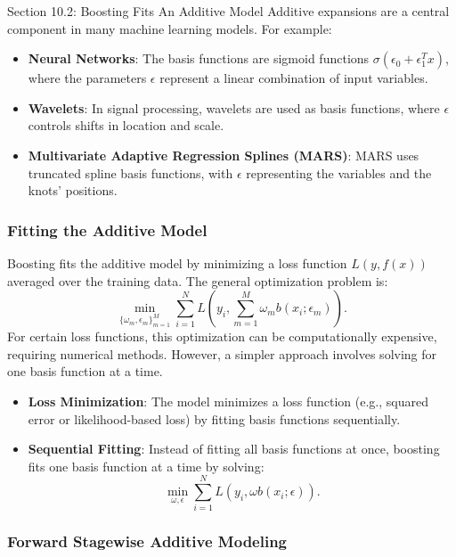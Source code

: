 \begin{notes}{Section 10.2: Boosting Fits An Additive Model}
    Additive expansions are a central component in many machine learning models. For example:
    \begin{itemize}
        \item \textbf{Neural Networks}: The basis functions are sigmoid functions $\sigma(\epsilon_0 + \epsilon_1^T x)$, where the parameters $\epsilon$ represent a linear combination of input variables.
        \item \textbf{Wavelets}: In signal processing, wavelets are used as basis functions, where $\epsilon$ controls shifts in location and scale.
        \item \textbf{Multivariate Adaptive Regression Splines (MARS)}: MARS uses truncated spline basis functions, with $\epsilon$ representing the variables and the knots' positions.
    \end{itemize}
    
    \subsubsection*{Fitting the Additive Model}
    
    Boosting fits the additive model by minimizing a loss function $L(y, f(x))$ averaged over the training data. The general optimization problem is:
    \[
    \min_{\{ \omega_m, \epsilon_m \}_{m=1}^M} \sum_{i=1}^{N} L\left( y_i, \sum_{m=1}^{M} \omega_m b(x_i; \epsilon_m) \right).
    \]
    For certain loss functions, this optimization can be computationally expensive, requiring numerical methods. However, a simpler approach involves solving for one basis function at a time.
    
    \begin{highlight}
        \begin{itemize}
            \item \textbf{Loss Minimization}: The model minimizes a loss function (e.g., squared error or likelihood-based loss) by fitting basis functions sequentially.
            \item \textbf{Sequential Fitting}: Instead of fitting all basis functions at once, boosting fits one basis function at a time by solving:
            \[
            \min_{\omega, \epsilon} \sum_{i=1}^{N} L\left( y_i, \omega b(x_i; \epsilon) \right).
            \]
        \end{itemize}
    \end{highlight}
    
    \subsubsection*{Forward Stagewise Additive Modeling}
    

\end{notes}
